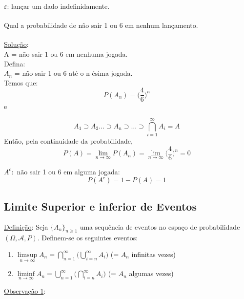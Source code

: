 \documentclass[a4paper,12pt]{article}
\begin{document}
\begin{enumerate}[label = \alph*)]
$\varepsilon$: lançar um dado indefinidamente.\\
\\
Qual a probabilidade de não sair 1 ou 6 em nenhum lançamento.\\
\\
\underline{Solução}:\\
A = não sair 1 ou 6 em nenhuma jogada.\\
Defina:\\
$A_n$ = não sair 1 ou 6 até o n-ésima jogada.\\
Temos que:
$$P(A_n)= \bigg(\frac{4}{6}\bigg)^n$$
e

$$A_1\supset A_2 \ldots \supset A_n \supset \ldots \supset \bigcap\limits_{i=1}^{\infty}A_i= A$$
Então, pela continuidade da probabilidade,
$$P(A)=\displaystyle{\lim_{n \to \infty}}  P(A_n) = \displaystyle{\lim_{n \to \infty}} \bigg(\frac{4}{6}\bigg)^n=0 $$

$A^c:$ não sair 1 ou 6 em alguma jogada:
$$P(A^c)=1-P(A)=1 $$

\end{enumerate}

\newpage

\subsection{Limite Superior e inferior de Eventos}

\underline{Definição}: Seja $\{A_n\}_{n\ge 1}$ uma sequência de eventos no espaço de probabilidade $(\Omega,\mathscr{A},P)$. Definem-se os
seguintes eventos:
\begin{enumerate}[label=\alph*)]
	\item $\limsup\limits_{n\rightarrow \infty} A_n = \bigcap\limits_{n=1}^\infty\bigg(\bigcup\limits_{i=n}^\infty A_i\bigg)$ (= $A_n$ infinitas vezes)
		\item $\liminf\limits_{n\rightarrow \infty} A_n = \bigcup\limits_{n=1}^\infty\bigg(\bigcap\limits_{i=n}^\infty A_i\bigg)$ (= $A_n$ algumas vezes)
\end{enumerate} 

\underline{Observação 1}:\\
\\
\end{document}
